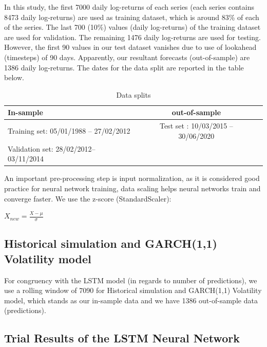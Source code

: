 \documentclass[a4paper,11pt,oneside]{book}
\begin{document}
In this study, the first 7000 daily log-returns of each series (each series contains 8473 daily log-returns) are used as training dataset, which is around 83\% of each of the series. The last 700 (10\%) values (daily log-returns) of the training dataset are used for validation. The remaining 1476 daily log-returns are used for testing. However, the first 90 values in our test dataset vanishes due to use of lookahead (timesteps) of 90 days. Apparently, our resultant forecasts (out-of-sample) are 1386 daily log-returns. The dates for the data split are reported in the table below.
\newline\newline\newline\newline\newline
\begin{table}[!h]
	\centering
	\begin{tabular}{l|cl}
		\hline \hline
		In-sample
		& out-of-sample\\ \hline
		Training set: 05/01/1988 – 27/02/2012
		& Test set
		: 10/03/2015 – 30/06/2020
	 \\
		Validation set: 28/02/2012– 03/11/2014
		\\
		\hline \hline
	\end{tabular}
	\caption{Data splits}
	\label{firsttab}
\end{table}

An important pre-processing step is input normalization, as it is considered good practice for neural network training, data scaling helps neural networks train and converge faster. We use the z-score (StandardScaler): 

\begin{center}
	$X_{new} = \frac{X-\mu}{\sigma}$
\end{center}




\subsection{Historical simulation and GARCH(1,1) Volatility model}
For congruency with the LSTM model (in regards to number of predictions), we use a rolling window of 7090 for Historical simulation and GARCH(1,1) Volatility model, which stands as our in-sample data and we have 1386 out-of-sample data (predictions).

\subsection{Trial Results of the LSTM Neural Network}
\end{document}
